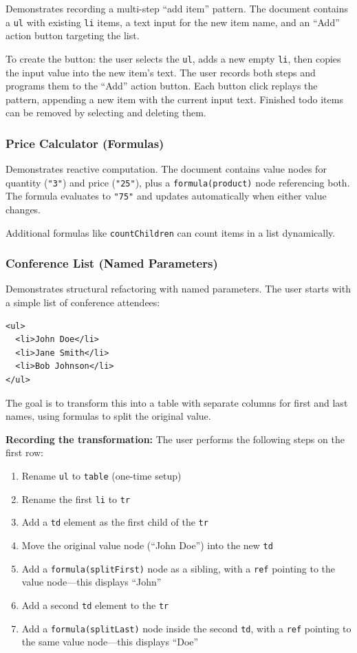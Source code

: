 \documentclass{article}
\begin{document}
Demonstrates recording a multi-step ``add item'' pattern. The document contains a \texttt{ul} with existing \texttt{li} items, a text input for the new item name, and an ``Add'' action button targeting the list.

To create the button: the user selects the \texttt{ul}, adds a new empty \texttt{li}, then copies the input value into the new item's text. The user records both steps and programs them to the ``Add'' action button. Each button click replays the pattern, appending a new item with the current input text. Finished todo items can be removed by selecting and deleting them.

\subsubsection{Price Calculator (Formulas)}

Demonstrates reactive computation. The document contains value nodes for quantity (\texttt{"3"}) and price (\texttt{"25"}), plus a \texttt{formula(product)} node referencing both. The formula evaluates to \texttt{"75"} and updates automatically when either value changes.

Additional formulas like \texttt{countChildren} can count items in a list dynamically.

\subsubsection{Conference List (Named Parameters)}

Demonstrates structural refactoring with named parameters. The user starts with a simple list of conference attendees:

\begin{verbatim}
<ul>
  <li>John Doe</li>
  <li>Jane Smith</li>
  <li>Bob Johnson</li>
</ul>
\end{verbatim}

The goal is to transform this into a table with separate columns for first and last names, using formulas to split the original value.

\textbf{Recording the transformation:} The user performs the following steps on the first row:
\begin{enumerate}
\setlength{\itemsep}{-3pt}
\item Rename \texttt{ul} to \texttt{table} (one-time setup)
\item Rename the first \texttt{li} to \texttt{tr}
\item Add a \texttt{td} element as the first child of the \texttt{tr}
\item Move the original value node (``John Doe'') into the new \texttt{td}
\item Add a \texttt{formula(splitFirst)} node as a sibling, with a \texttt{ref} pointing to the value node---this displays ``John''
\item Add a second \texttt{td} element to the \texttt{tr}
\item Add a \texttt{formula(splitLast)} node inside the second \texttt{td}, with a \texttt{ref} pointing to the same value node---this displays ``Doe''
\end{enumerate}
\end{document}
